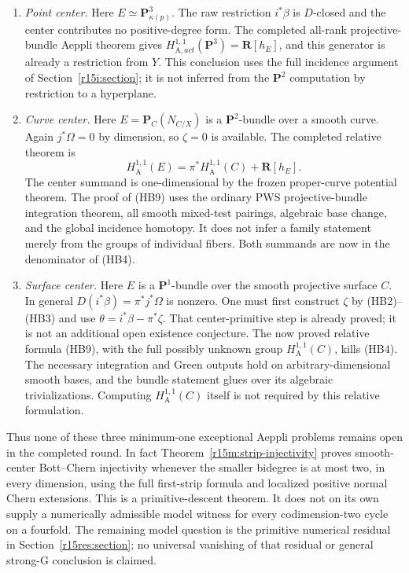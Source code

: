 \begin{enumerate}
\item \emph{Point center.} Here $E\simeq\mathbf P^3_{\kappa(p)}$.
The raw restriction $i^*\beta$ is $D$-closed and the center contributes
no positive-degree form. The completed all-rank projective-bundle
Aeppli theorem gives
$H_{\mathrm A,act}^{1,1}(\mathbf P^3)=\mathbf R[h_E]$,
and this generator is already a restriction from $Y$.
This conclusion uses the full incidence argument of
Section~\ref{r15i:section}; it is not inferred from the
$\mathbf P^2$ computation by restriction to a hyperplane.

\item \emph{Curve center.} Here $E=\mathbf P_C(N_{C/X})$ is a
$\mathbf P^2$-bundle over a smooth curve. Again $j^*\Omega=0$ by
dimension, so $\zeta=0$ is available. The completed relative theorem is
\[
 H_{\mathrm A}^{1,1}(E)
       =\pi^*H_{\mathrm A}^{1,1}(C)+\mathbf R[h_E].
\tag{HB9}
\]
The center summand is one-dimensional by the frozen proper-curve
potential theorem. The proof of (HB9) uses the ordinary PWS
projective-bundle integration theorem, all smooth mixed-test
pairings, algebraic base change, and the global incidence
homotopy. It does not infer a family statement merely from
the groups of individual fibers. Both summands are now in
the denominator of (HB4).

\item \emph{Surface center.} Here $E$ is a $\mathbf P^1$-bundle over
the smooth projective surface $C$. In general
$D(i^*\beta)=\pi^*j^*\Omega$ is nonzero. One must first construct
$\zeta$ by (HB2)--(HB3) and use $\theta=i^*\beta-\pi^*\zeta$.
That center-primitive step is already proved; it is not an additional
open existence conjecture. The now proved relative formula
(HB9), with the full possibly unknown group
$H_{\mathrm A}^{1,1}(C)$, kills (HB4). The necessary integration
and Green outputs hold on arbitrary-dimensional smooth bases,
and the bundle statement glues over its algebraic
trivializations. Computing $H_{\mathrm A}^{1,1}(C)$ itself
is not required by this relative formulation.
\end{enumerate}

Thus none of these three minimum-one exceptional Aeppli
problems remains open in the completed round.  In fact
Theorem~\ref{r15m:strip-injectivity} proves smooth-center
Bott--Chern injectivity whenever the smaller bidegree is
at most two, in every dimension, using the full first-strip
formula and localized positive normal Chern extensions.
This is a primitive-descent theorem.  It does not on its
own supply a numerically admissible model witness for
every codimension-two cycle on a fourfold.  The remaining
model question is the primitive numerical residual in
Section~\ref{r15res:section}; no universal vanishing of
that residual or general strong-G conclusion is claimed.


